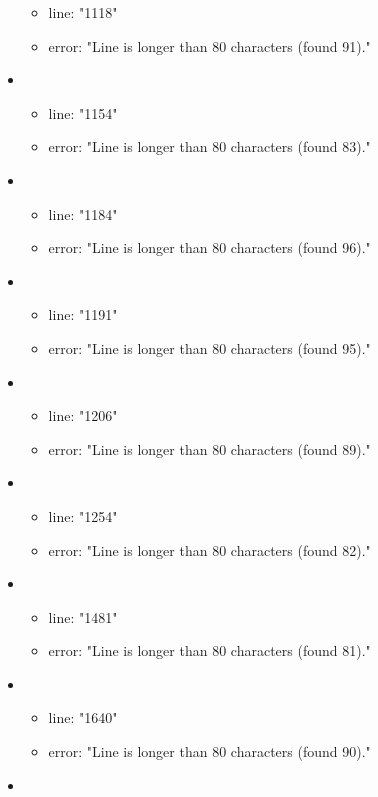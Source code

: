 \begin{itemize}
\begin{itemize}
		\item line: "1118" 
		\item error: "Line is longer than 80 characters (found 91)." 
	\end{itemize}
	\item 
	\begin{itemize} 
		\item line: "1154" 
		\item error: "Line is longer than 80 characters (found 83)." 
	\end{itemize}
	\item 
	\begin{itemize} 
		\item line: "1184" 
		\item error: "Line is longer than 80 characters (found 96)." 
	\end{itemize}
	\item 
	\begin{itemize} 
		\item line: "1191" 
		\item error: "Line is longer than 80 characters (found 95)." 
	\end{itemize}
	\item 
	\begin{itemize} 
		\item line: "1206" 
		\item error: "Line is longer than 80 characters (found 89)." 
	\end{itemize}
	\item 
	\begin{itemize} 
		\item line: "1254" 
		\item error: "Line is longer than 80 characters (found 82)." 
	\end{itemize}
	\item 
	\begin{itemize} 
		\item line: "1481" 
		\item error: "Line is longer than 80 characters (found 81)." 
	\end{itemize}
	\item 
	\begin{itemize} 
		\item line: "1640" 
		\item error: "Line is longer than 80 characters (found 90)." 
	\end{itemize}
	\item 
	\begin{itemize} 

\end{itemize}
\end{itemize}
